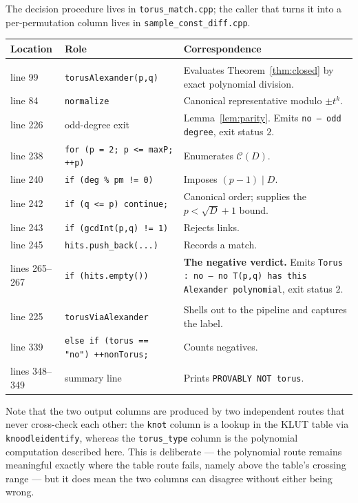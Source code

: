 \documentclass[11pt]{article}
\theoremstyle{definition}
\newcommand{\code}[1]{\texttt{#1}}
\begin{document}
The decision procedure lives in \code{torus\_match.cpp}; the caller that turns it into
a per-permutation column lives in \code{sample\_const\_diff.cpp}.

\begin{center}
\small
\begin{tabular}{@{}>{\raggedright\arraybackslash}p{2.9cm}>{\raggedright\arraybackslash}p{4.5cm}>{\raggedright\arraybackslash}p{6.6cm}@{}}
\toprule
\textbf{Location} & \textbf{Role} & \textbf{Correspondence} \\
\midrule
\multicolumn{3}{@{}l}{\emph{\code{torus\_match.cpp}} --- the decision procedure}\\[2pt]
line 99 & \code{torusAlexander(p,q)} & Evaluates Theorem~\ref{thm:closed} by exact polynomial division. \\
line 84 & \code{normalize} & Canonical representative modulo $\pm t^{k}$. \\
line 226 & odd-degree exit & Lemma~\ref{lem:parity}. Emits \code{no -- odd degree}, exit status $2$. \\
line 238 & \code{for (p = 2; p <= maxP; ++p)} & Enumerates $\mathcal{C}(D)$. \\
line 240 & \code{if (deg \% pm != 0)} & Imposes $(p-1)\mid D$. \\
line 242 & \code{if (q <= p) continue;} & Canonical order; supplies the $p<\sqrt{D}+1$ bound. \\
line 243 & \code{if (gcdInt(p,q) != 1)} & Rejects links. \\
line 245 & \code{hits.push\_back(...)} & Records a match. \\
lines 265--267 & \code{if (hits.empty())} & \textbf{The negative verdict.} Emits \code{Torus : no -- no T(p,q) has this Alexander polynomial}, exit status $2$. \\[4pt]
\midrule
\multicolumn{3}{@{}l}{\emph{\code{sample\_const\_diff.cpp}} --- the caller}\\[2pt]
line 225 & \code{torusViaAlexander} & Shells out to the pipeline and captures the label. \\
line 339 & \code{else if (torus == "no") ++nonTorus;} & Counts negatives. \\
lines 348--349 & summary line & Prints \code{PROVABLY NOT torus}. \\
\bottomrule
\end{tabular}
\end{center}

Note that the two output columns are produced by two independent routes that never
cross-check each other: the \code{knot} column is a lookup in the KLUT table via
\code{knoodleidentify}, whereas the \code{torus\_type} column is the polynomial
computation described here. This is deliberate --- the polynomial route remains
meaningful exactly where the table route fails, namely above the table's crossing
range --- but it does mean the two columns can disagree without either being wrong.
\end{document}
